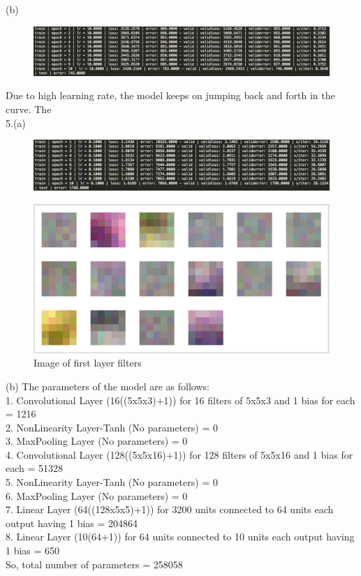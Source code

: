 \documentclass[11pt]{article}
\begin{document}
(b)
\begin{figure}[H]
\centering
\includegraphics[scale=0.5]{assign2/torch/outputLR10.png}
\caption{ \label{fig5}}
\end{figure}
Due to high learning rate, the model keeps on jumping back and forth in the curve. The \\
5.(a)
\begin{figure}[H]
\centering
\includegraphics[scale=0.5]{assign2/torch/outputCNN.png}
\caption{ \label{fig5}}
\end{figure}
 
\begin{figure}[H]
\centering
\includegraphics[scale=0.5]{assign2/torch/weightCNN.png}
\caption{Image of first layer filters \label{fig5}}
\end{figure}

(b) The parameters of the model are as follows: \\
1. Convolutional Layer (16((5x5x3)+1)) for 16 filters of 5x5x3 and 1 bias for each  = 1216\\
2. NonLinearity Layer-Tanh (No parameters) = 0\\
3. MaxPooling Layer (No parameters) = 0\\
4. Convolutional Layer (128((5x5x16)+1)) for 128 filters of 5x5x16 and 1 bias for each  = 51328\\
5. NonLinearity Layer-Tanh (No parameters) = 0 \\
6. MaxPooling Layer (No parameters) = 0\\
7. Linear Layer (64((128x5x5)+1)) for 3200 units connected to 64 units each output having 1 bias = 204864\\
8. Linear Layer (10(64+1)) for 64 units connected to 10 units each output having 1 bias = 650 \\
So, total number of parameters = 258058
\end{document}
